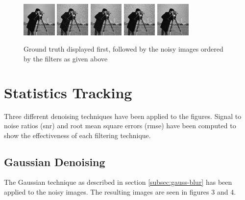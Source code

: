 \documentclass{article}
\begin{document}
\begin{figure}[H]
  \centering
  \includegraphics[width=0.15\textwidth]{images/camera_truth}
  \includegraphics[width=0.15\textwidth]{images/camera_noisy1}
  \includegraphics[width=0.15\textwidth]{images/camera_noisy2}
  \includegraphics[width=0.15\textwidth]{images/camera_noisy3}
  \includegraphics[width=0.15\textwidth]{images/camera_noisy4}
  \caption{Ground truth displayed first, followed by the noisy
    images ordered by the filters as given above}
\end{figure}   
% 
\section{Statistics Tracking}
\label{sec:stats-tracking}
% 
Three different denoising techniques have been applied to the
figures. Signal to noise ratios (snr) and root mean
square errors (rmse) have been computed to show the effectiveness of each
filtering technique.
% 
\subsection{Gaussian Denoising}
\label{subsec:gauss-denoise}
The Gaussian technique as described in section \ref{subsec:gauss-blur} has been applied
to the noisy images. The resulting images are seen in figures 3 and 4.
\end{document}
